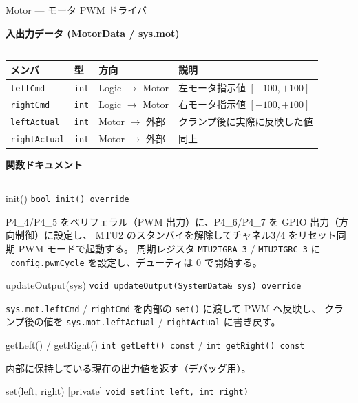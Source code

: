 \documentclass[a4paper,11pt,dvipdfmx]{jsarticle}
\makeatletter
\newcommand{\apisection}[1]{%
  \par\addvspace{4mm}%
  {\normalsize\bfseries\color{headerblue} #1}%
  \par\vspace{-1mm}%
  {\color{accentblue!40}\rule{\linewidth}{0.5pt}}%
  \par\nobreak\vspace{2mm}%
  \@afterheading
}
\makeatother
\begin{document}
\begin{apibox}{Motor --- モータ PWM ドライバ}
\apisection{入出力データ (MotorData / sys.mot)}

\begin{tabularx}{\textwidth}{l l l X}
\toprule
\textbf{メンバ} & \textbf{型} & \textbf{方向} & \textbf{説明} \\
\midrule
\texttt{leftCmd}     & \texttt{int} & Logic $\rightarrow$ Motor & 左モータ指示値 $[-100, +100]$ \\
\texttt{rightCmd}    & \texttt{int} & Logic $\rightarrow$ Motor & 右モータ指示値 $[-100, +100]$ \\
\texttt{leftActual}  & \texttt{int} & Motor $\rightarrow$ 外部  & クランプ後に実際に反映した値 \\
\texttt{rightActual} & \texttt{int} & Motor $\rightarrow$ 外部  & 同上 \\
\bottomrule
\end{tabularx}

\apisection{関数ドキュメント}

\begin{funcblock}{init()}
\texttt{bool init() override}

\vspace{1.5mm}
P4\_4/P4\_5 をペリフェラル（PWM 出力）に、P4\_6/P4\_7 を GPIO 出力（方向制御）に設定し、
MTU2 のスタンバイを解除してチャネル3/4 をリセット同期 PWM モードで起動する。
周期レジスタ \texttt{MTU2TGRA\_3} / \texttt{MTU2TGRC\_3} に
\texttt{\_config.pwmCycle} を設定し、デューティは 0 で開始する。
\end{funcblock}

\begin{funcblock}{updateOutput(sys)}
\texttt{void updateOutput(SystemData\& sys) override}

\vspace{1.5mm}
\texttt{sys.mot.leftCmd} / \texttt{rightCmd} を内部の \texttt{set()} に渡して PWM へ反映し、
クランプ後の値を \texttt{sys.mot.leftActual} / \texttt{rightActual} に書き戻す。
\end{funcblock}

\begin{funcblock}{getLeft() / getRight()}
\texttt{int getLeft() const} / \texttt{int getRight() const}

\vspace{1.5mm}
内部に保持している現在の出力値を返す（デバッグ用）。
\end{funcblock}

\begin{funcblock}{set(left, right) \normalfont\small\color{gray}[private]}
\texttt{void set(int left, int right)}


\end{funcblock}
\end{apibox}
\end{document}
